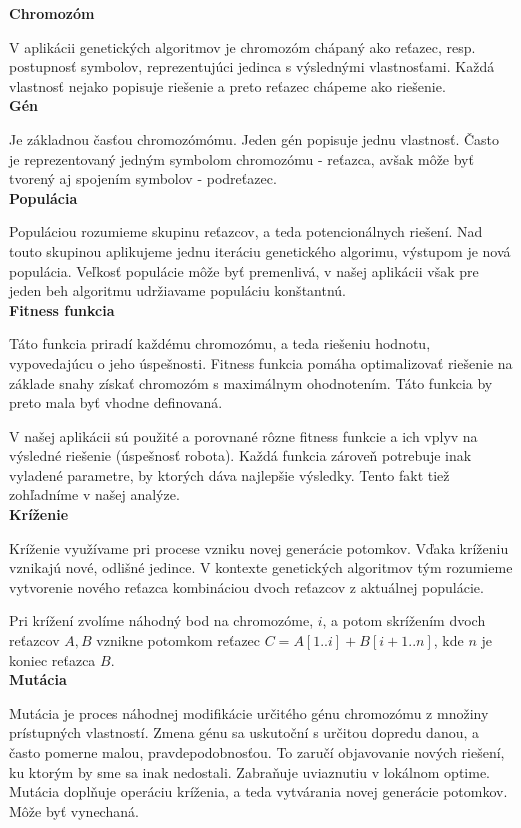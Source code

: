 \documentclass[10pt]{paper}
\begin{document}
\textbf{Chromozóm}

V aplikácii genetických algoritmov je chromozóm chápaný ako reťazec, resp. postupnosť symbolov, reprezentujúci jedinca s výslednými vlastnosťami. Každá vlastnosť nejako popisuje riešenie a preto reťazec chápeme ako riešenie.\\

\textbf{Gén}

Je základnou časťou chromozómómu. Jeden gén popisuje jednu vlastnosť. Často je reprezentovaný jedným symbolom chromozómu - reťazca, avšak môže byť tvorený aj spojením symbolov - podreťazec.\\

\textbf{Populácia}

Populáciou rozumieme skupinu reťazcov, a teda potencionálnych riešení. Nad touto skupinou aplikujeme jednu iteráciu genetického algorimu, výstupom je nová populácia. Veľkosť populácie môže byť premenlivá, v našej aplikácii však pre jeden beh algoritmu udržiavame populáciu konštantnú.\\

\textbf{Fitness funkcia}

Táto funkcia priradí každému chromozómu, a teda riešeniu hodnotu, vypovedajúcu o jeho úspešnosti. Fitness funkcia pomáha optimalizovať riešenie na základe snahy získať chromozóm s maximálnym ohodnotením. Táto funkcia by preto mala byť vhodne definovaná.

V našej aplikácii sú použité a porovnané rôzne fitness funkcie a ich vplyv na výsledné riešenie (úspešnosť robota). Každá funkcia zároveň potrebuje inak vyladené parametre, by ktorých dáva najlepšie výsledky. Tento fakt tiež zohľadníme v našej analýze.\\

\textbf{Kríženie}

Kríženie využívame pri procese vzniku novej generácie potomkov. Vďaka kríženiu vznikajú nové, odlišné jedince. V kontexte genetických algoritmov tým rozumieme vytvorenie nového reťazca kombináciou dvoch reťazcov z aktuálnej populácie. 

Pri krížení zvolíme náhodný bod na chromozóme, $i$, a potom skrížením dvoch reťazcov $A,B$ vznikne potomkom reťazec $C = A[1..i] + B[i+1..n]$, kde $n$ je koniec reťazca $B$.\\

\textbf{Mutácia}

Mutácia je proces náhodnej modifikácie určitého génu chromozómu z množiny prístupných vlastností. Zmena génu sa uskutoční s určitou dopredu danou, a často pomerne malou, pravdepodobnosťou. To zaručí objavovanie nových riešení, ku ktorým by sme sa inak nedostali. Zabraňuje uviaznutiu v lokálnom optime. Mutácia doplňuje operáciu kríženia, a teda vytvárania novej generácie potomkov. Môže byť vynechaná.
\end{document}
